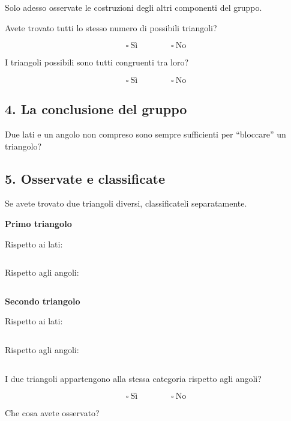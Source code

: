 \documentclass[10pt,a4paper]{article}
\newcommand{\righe}{
\vspace{1mm}
\hrulefill

\vspace{3mm}
\hrulefill

\vspace{3mm}
\hrulefill
}
\begin{document}
Solo adesso osservate le costruzioni degli altri componenti del gruppo.

Avete trovato tutti lo stesso numero di possibili triangoli?

\[
\square\ \text{Sì}
\qquad\qquad
\square\ \text{No}
\]

I triangoli possibili sono tutti congruenti tra loro?

\[
\square\ \text{Sì}
\qquad\qquad
\square\ \text{No}
\]

\subsection*{4. La conclusione del gruppo}

Due lati e un angolo non compreso sono sempre sufficienti
per ``bloccare'' un triangolo?

\righe

\subsection*{5. Osservate e classificate}

Se avete trovato due triangoli diversi, classificateli separatamente.

\textbf{Primo triangolo}

Rispetto ai lati:

\[
\boxed{\hspace{5cm}}
\]

Rispetto agli angoli:

\[
\boxed{\hspace{5cm}}
\]

\textbf{Secondo triangolo}

Rispetto ai lati:

\[
\boxed{\hspace{5cm}}
\]

Rispetto agli angoli:

\[
\boxed{\hspace{5cm}}
\]

I due triangoli appartengono alla stessa categoria rispetto agli angoli?

\[
\square\ \text{Sì}
\qquad\qquad
\square\ \text{No}
\]

Che cosa avete osservato?

\righe
\end{document}
